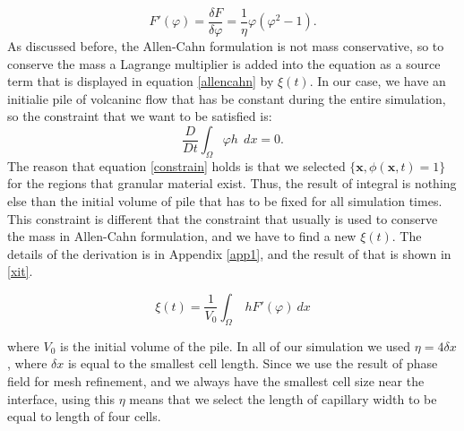 \documentclass[letterpaper,10pt]{article}
\begin{document}
\begin{equation} 
	\label{fprime}
	F'(\varphi)= \frac{\delta F}{\delta \varphi} = \frac{1}{\eta} \varphi (\varphi^2 -1).
\end{equation}
As discussed before, the Allen-Cahn formulation is not mass conservative, so to conserve the mass a Lagrange multiplier is added into 
the equation as a source term that is displayed in equation \eqref{allencahn} by $\xi(t)$. In our case, we have an initialie pile of volcaninc flow that has be constant during the entire simulation, so the constraint that we want to be satisfied is:
\begin{equation} 
	\label{constrain}
	\frac{D}{Dt} \int_\Omega \varphi h \ \ dx= 0.
\end{equation}
The reason that equation \eqref{constrain} holds is that we selected $ \lbrace \textbf{x}, \phi(\textbf{x},t)= 1 \rbrace  $ for the regions that granular material exist. Thus, the result of integral is nothing else than the initial volume of pile that has to be fixed for all simulation times. This constraint is different that the constraint that usually is used to conserve the mass in Allen-Cahn formulation, and we have to find a new $\xi(t)$. The details of the derivation is in Appendix \ref{app1}, and the result of that is shown in \eqref{xit}.

\begin{equation} 
	\label{xit}
	\xi(t) = \frac{1}{V_0} \int_\Omega\  h F'(\varphi) \ dx
\end{equation}
 
where  $ V_0 $ is the initial volume of the pile.
In all of our simulation we used $\eta=4\delta x$, where $\delta x$ is equal to the smallest cell length. Since we use the result of phase field for mesh refinement, and we always have the smallest cell size near the interface, using this $\eta$ means that we select the length of capillary width to be equal to length of four cells.
% 
\end{document}
